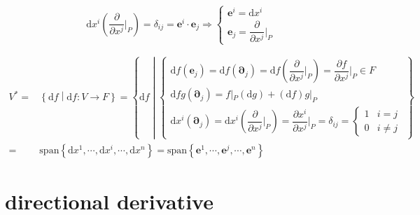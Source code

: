 \documentclass[
]{book}
\theoremstyle{definition}
\theoremstyle{definition}
\theoremstyle{definition}
\theoremstyle{definition}
\theoremstyle{remark}
\begin{document}
\[
\mathrm{d}x^{{\scriptscriptstyle i}}\left(\dfrac{\partial}{\partial x^{{\scriptscriptstyle j}}}|_{{\scriptscriptstyle P}}\right)=\delta_{{\scriptscriptstyle ij}}=\boldsymbol{e}^{{\scriptscriptstyle i}}\cdot\boldsymbol{e}_{{\scriptscriptstyle j}}\Rightarrow\begin{cases}
\boldsymbol{e}^{{\scriptscriptstyle i}}=\mathrm{d}x^{{\scriptscriptstyle i}}\\
\boldsymbol{e}_{{\scriptscriptstyle j}}=\dfrac{\partial}{\partial x^{{\scriptscriptstyle j}}}|_{{\scriptscriptstyle P}}
\end{cases}
\]

\[
\begin{aligned}
V^{*}= & \left\{ \mathrm{d}f\middle|\mathrm{d}f:V\rightarrow F\right\} =\left\{ \mathrm{d}f\middle|\begin{cases}
\mathrm{d}f\left(\boldsymbol{e}_{{\scriptscriptstyle j}}\right)=\mathrm{d}f\left(\boldsymbol{\partial}_{{\scriptscriptstyle j}}\right)=\mathrm{d}f\left(\dfrac{\partial}{\partial x^{{\scriptscriptstyle j}}}|_{{\scriptscriptstyle P}}\right)=\dfrac{\partial f}{\partial x^{{\scriptscriptstyle j}}}|_{{\scriptscriptstyle P}}\in F\\
\mathrm{d}fg\left(\boldsymbol{\partial}_{{\scriptscriptstyle j}}\right)=f|_{{\scriptscriptstyle P}}\left(\mathrm{d}g\right)+\left(\mathrm{d}f\right)g|_{{\scriptscriptstyle P}}\\
\mathrm{d}x^{{\scriptscriptstyle i}}\left(\boldsymbol{\partial}_{{\scriptscriptstyle j}}\right)=\mathrm{d}x^{{\scriptscriptstyle i}}\left(\dfrac{\partial}{\partial x^{{\scriptscriptstyle j}}}|_{{\scriptscriptstyle P}}\right)=\dfrac{\partial x^{{\scriptscriptstyle i}}}{\partial x^{{\scriptscriptstyle j}}}|_{{\scriptscriptstyle P}}=\delta_{{\scriptscriptstyle ij}}=\begin{cases}
1 & i=j\\
0 & i\ne j
\end{cases}
\end{cases}\right\} \\
= & \mathrm{span}\left\{ \mathrm{d}x^{{\scriptscriptstyle 1}},\cdots,\mathrm{d}x^{{\scriptscriptstyle i}},\cdots,\mathrm{d}x^{{\scriptscriptstyle n}}\right\} =\mathrm{span}\left\{ \boldsymbol{e}^{{\scriptscriptstyle 1}},\cdots,\boldsymbol{e}^{{\scriptscriptstyle j}},\cdots,\boldsymbol{e}^{{\scriptscriptstyle n}}\right\} 
\end{aligned}
\]

\hypertarget{directional-derivative}{%
\section{directional derivative}\label{directional-derivative}}
\end{document}
